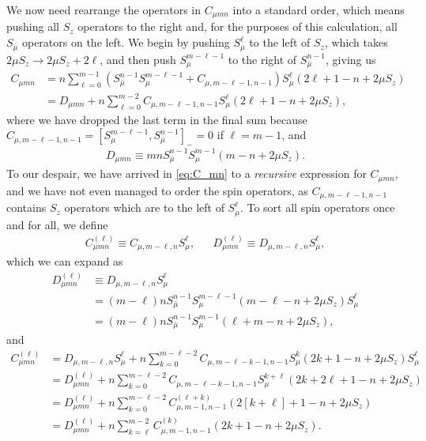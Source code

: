 \documentclass[aps,notitlepage,nofootinbib,11pt]{revtex4-1}
\newcommand{\p}[1]{\left(#1\right)} %
\renewcommand{\sp}[1]{\left[#1\right]} %
\newcommand{\bmu}{{\bar\mu}}
\newcommand{\1}{\mathds{1}}
\begin{document}
We now need rearrange the operators in $C_{\mu mn}$ into a standard
order, which means pushing all $S_z$ operators to the right and, for
the purposes of this calculation, all $S_\bmu$ operators on the left.
We begin by pushing $S_\mu^\ell$ to the left of $S_z$, which takes
$2\mu S_z\to 2\mu S_z+2\ell$, and then push $S_\mu^{m-\ell-1}$ to the
right of $S_\bmu^{n-1}$, giving us
\begin{align}
  C_{\mu mn}
  &= n \sum_{\ell=0}^{m-1}
  \p{S_\bmu^{n-1} S_\mu^{m-\ell-1} + C_{\mu,m-\ell-1,n-1}} S_\mu^\ell
  \p{2\ell + 1 - n + 2\mu S_z} \\
  &= D_{\mu mn}
  + n \sum_{\ell=0}^{m-2} C_{\mu,m-\ell-1,n-1}
  S_\mu^\ell \p{2\ell + 1 - n + 2\mu S_z},
  \label{eq:C_mn}
\end{align}
where we have dropped the last term in the final sum because
$C_{\mu,m-\ell-1,n-1}=\sp{S_\mu^{m-\ell-1},S_\bmu^{n-1}}_-=0$ if
$\ell=m-1$, and
\begin{align}
  D_{\mu mn}
  \equiv mn S_\bmu^{n-1} S_\mu^{m-1} \p{m - n + 2\mu S_z}.
  \label{eq:D_mn}
\end{align}
To our despair, we have arrived in \eqref{eq:C_mn} to a {\it
  recursive} expression for $C_{\mu mn}$, and we have not even managed
to order the spin operators, as $C_{\mu,m-\ell-1,n-1}$ contains $S_z$
operators which are to the left of $S_\mu^\ell$.  To sort all spin
operators once and for all, we define
\begin{align}
  C_{\mu mn}^{(\ell)} \equiv C_{\mu,m-\ell,n} S_\mu^\ell,
  &&
  D_{\mu mn}^{(\ell)} \equiv D_{\mu,m-\ell,n} S_\mu^\ell,
\end{align}
which we can expand as
\begin{align}
  D_{\mu mn}^{(\ell)}
  &\equiv D_{\mu,m-\ell,n}S_\mu^\ell \\
  &= \p{m-\ell}n S_\bmu^{n-1} S_\mu^{m-\ell-1}
  \p{m-\ell-n+2\mu S_z} S_\mu^\ell \\
  &= \p{m-\ell}n S_\bmu^{n-1} S_\mu^{m-1} \p{\ell+m-n+2\mu S_z},
  \label{eq:D_mn_ell}
\end{align}
and
\begin{align}
  C_{\mu mn}^{(\ell)}
  &= D_{\mu,m-\ell,n} S_\mu^\ell + n \sum_{k=0}^{m-\ell-2}
  C_{\mu,m-\ell-k-1,n-1} S_\mu^k \p{2k+1-n+2\mu S_z} S_\mu^\ell \\
  &= D_{\mu mn}^{(\ell)} + n \sum_{k=0}^{m-\ell-2}
  C_{\mu,m-\ell-k-1,n-1} S_\mu^{k+\ell} \p{2k+2\ell+1-n+2\mu S_z} \\
  &= D_{\mu mn}^{(\ell)} + n \sum_{k=0}^{m-\ell-2}
  C_{\mu,m-1,n-1}^{(\ell+k)} \p{2\sp{k+\ell}+1-n+2\mu S_z} \\
  &= D_{\mu mn}^{(\ell)} + n \sum_{k=\ell}^{m-2}
  C_{\mu,m-1,n-1}^{(k)} \p{2k+1-n+2\mu S_z}.
  \label{eq:C_mn_ell}
\end{align}
\end{document}

